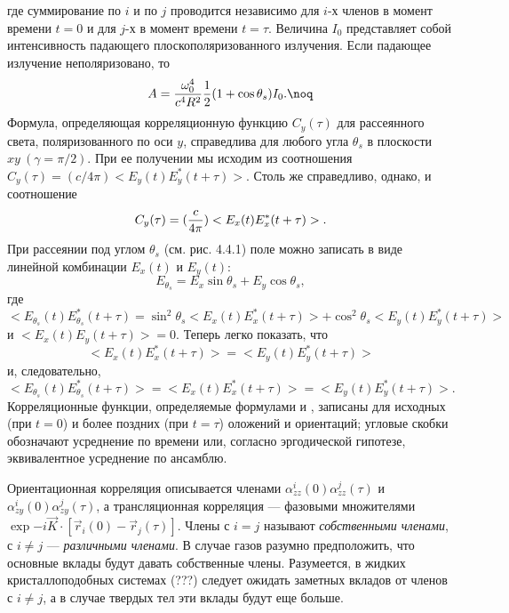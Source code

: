 где суммирование по $i$ и по $j$ проводится независимо для $i$-х
членов в момент времени $t=0$ и для $j$-х в момент времени
$t=\tau$. Величина $I_0$ представляет собой интенсивность падающего
плоскополяризованного излучения. Если падающее излучение неполяризовано, то
$$A={\omega_0^4\over c^4R^2}{1\over2}(1+\cos\theta_s)I_0.\noq$$
Формула, определяющая корреляционную функцию $C_y(\tau)$ для
рассеянного света, поляризованного по оси $y$, справедлива для
любого угла $\theta_s$ в плоскости $xy\ (\gamma=\pi/2)$. При ее
получении мы исходим из соотношения
$C_y(\tau)=(c/4\pi)<E_y(t)E_y^*(t+\tau)>$. Столь же справедливо,
однако, и соотношение
$$C_y(\tau)=({c\over4\pi})<E_x(t)E_x^*(t+\tau)>.$$
При рассеянии под углом $\theta_s$ (см. рис. 4.4.1) поле можно
записать в виде линейной комбинации $E_x(t)$ и $E_y(t)$:
$$E_{\theta_s}=E_x\sin\theta_s+E_y\cos\theta_s,$$
где
$$<E_{\theta_s}(t)E_{\theta_s}^*(t+\tau)=\sin^2\theta_s<E_x(t)E_x^*(t+\tau)>
+\cos^2\theta_s<E_y(t)E_y^*(t+\tau)>$$
и $<E_x(t)E_y(t+\tau)>=0$. Теперь легко показать, что
$$<E_x(t)E_x^*(t+\tau)>=<E_y(t)E_y^*(t+\tau)>$$
и, следовательно,
$$<E_{\theta_s}(t)E_{\theta_s}^*(t+\tau)>=<E_x(t)E_x^*(t+\tau)>=
<E_y(t)E_y^*(t+\tau)>.$$
Корреляционные функции, определяемые формулами  и
, записаны для исходных (при $t=0$) и более поздних (при
$t=\tau$) оложений и ориентаций; угловые скобки обозначают
усреднение по времени или, согласно эргодической гипотезе,
эквивалентное усреднение по ансамблю.

Ориентационная корреляция описывается
членами $\alpha_{zz}^i(0)\alpha_{zz}^j(\tau)$ и
$\alpha_{zy}^i(0)\alpha_{zy}^j(\tau)$, а трансляционная
корреляция --- фазовыми множителями $\exp{-i\vec K\cdot[\vec
r_i(0)-\vec r_j(\tau)]}$. Члены с $i=j$ называют {\it
собственными членами}, с $i\not=j$ --- {\it различными членами}. В
случае газов разумно предположить, что основные вклады будут
давать собственные члены. Разумеется, в жидких кристаллоподобных
системах  (???)  следует ожидать заметных вкладов от членов с
$i\not=j$, а в случае твердых тел эти вклады будут еще больше.


